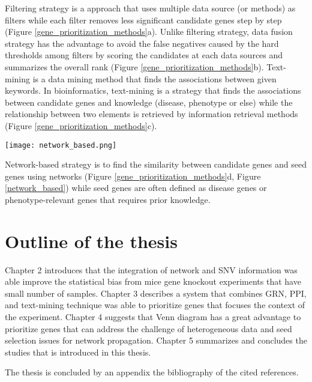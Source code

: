 \documentclass[oneside,phd]{snuthesis}
\begin{document}
Filtering strategy is a approach that uses multiple data source (or methods) as filters while each filter removes less significant candidate genes step by step (Figure \ref{gene_prioritization_methods}a).
Unlike filtering strategy, data fusion strategy has the advantage to avoid the false negatives caused by the hard thresholds among filters by scoring the candidates at each data sources and summarizes the overall rank (Figure \ref{gene_prioritization_methods}b). 
Text-mining is a data mining method that finds the associations between given keywords. 
In bioinformatics, text-mining is a strategy that finds the associations between candidate genes and knowledge (disease, phenotype or else) while the relationship between two elements is retrieved by information retrieval methods \citep{krallinger2008linking, winnenburg2008facts}(Figure \ref{gene_prioritization_methods}c).
\begin{figure*}
\begin{center}
\texttt{[image: network\_based.png]}
\end{center}
\caption{Work flow for prioritizing genes (Moreau and Tranchevent, 2012)}
\scriptsize{Network-based strategy is to find the similarity between candidate genes and seed genes using networks (Figure \ref{gene_prioritization_methods}d, Figure \ref{network_based}) while seed genes are often defined as disease genes or phenotype-relevant genes that requires prior knowledge.}
\label{network_based}
\end{figure*}






\section{Outline of the thesis}

Chapter 2 introduces that the integration of network and SNV information was able improve the statistical bias from mice gene knockout experiments that have small number of samples.
Chapter 3 describes a system that combines GRN, PPI, and text-mining technique was able to prioritize genes that focuses the context of the experiment.
Chapter 4 suggests that Venn diagram has a great advantage to prioritize genes that can address the challenge of heterogeneous data and seed selection issues for network propagation.
Chapter 5 summarizes and concludes the studies that is introduced in this thesis.

The thesis is concluded by an appendix the bibliography of the cited references.
\end{document}
